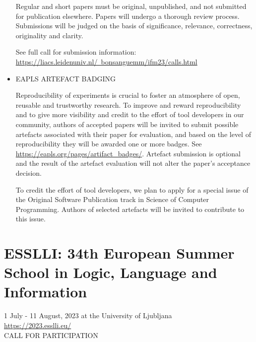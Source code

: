 \documentclass[prodmode,acmtecs]{acmsmall} %
\begin{document}
\begin{itemize}
  Regular and short papers must be original, unpublished, and not submitted for publication elsewhere. Papers will undergo a thorough review process. Submissions will be judged on the basis of significance, relevance, correctness, originality and clarity. 
 
  See full call for submission information: \href{https://liacs.leidenuniv.nl/~bonsanguemm/ifm23/calls.html}{https://liacs.leidenuniv.nl/~bonsanguemm/ifm23/calls.html} 
 
\item  EAPLS ARTEFACT BADGING 
 
  Reproducibility of experiments is crucial to foster an atmosphere of open, reusable and trustworthy research. To improve and reward reproducibility and to give more visibility and credit to the effort of tool developers in our community, authors of accepted papers will be invited to submit possible artefacts associated with their paper for evaluation, and based on the level of reproducibility they will be awarded one or more badges. See \href{https://eapls.org/pages/artifact_badges/}{https://eapls.org/pages/artifact\_badges/}. Artefact submission is optional and the result of the artefact evaluation will not alter the paper’s acceptance decision. 
 
  To credit the effort of tool developers, we plan to apply for a special issue of the Original Software Publication track in Science of Computer Programming. Authors of selected artefacts will be invited to contribute to this issue.  
 
\end{itemize}\section{ESSLLI: 34th European Summer School in Logic, Language and Information}\label{ESSLLI}  1 July - 11 August, 2023 at the University of Ljubljana\\ 
  \href{https://2023.esslli.eu/}{https://2023.esslli.eu/}\\ 
CALL FOR PARTICIPATION 
\end{document}
